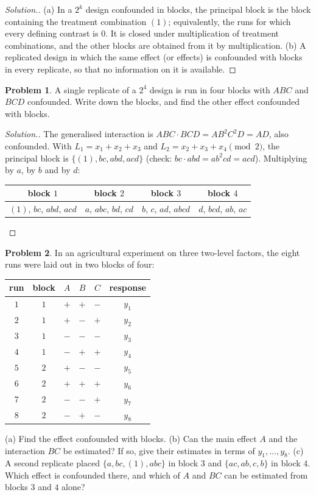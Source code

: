 \documentclass[11pt,a4paper]{article}
\numberwithin{equation}{section}
\theoremstyle{definition}
\newtheorem{problemx}{Problem}[subsection]
\newenvironment{problem}{\begin{problemx}}{\end{problemx}}
\newenvironment{solution}
  {\renewcommand{\qedsymbol}{}\begin{proof}[\textit{Solution}.]}
  {\end{proof}}
\begin{document}
\begin{solution}
(a) In a $2^k$ design confounded in blocks, the principal block is the block containing the treatment combination $(1)$; equivalently, the runs for
which every defining contrast is $0$. It is closed under multiplication of treatment combinations, and the other blocks are obtained from it by
multiplication. (b) A replicated design in which the same effect (or effects) is confounded with blocks in every replicate, so that no information
on it is available.
\end{solution}

\begin{problem}
A single replicate of a $2^4$ design is run in four blocks with $ABC$ and $BCD$ confounded. Write down the blocks, and find the other effect confounded
with blocks.
\end{problem}

\begin{solution}
The generalised interaction is $ABC \cdot BCD = AB^2C^2D = AD$, also confounded. With $L_1 = x_1 + x_2 + x_3$ and $L_2 = x_2 + x_3 + x_4 \pmod 2$, the principal block is
$\{(1), bc, abd, acd\}$ (check: $bc \cdot abd = ab^2cd = acd$). Multiplying by $a$, by $b$ and by $d$:
\begin{center}
\begin{tabular}{c|c|c|c}
block $1$ & block $2$ & block $3$ & block $4$ \\
\hline
$(1)$, $bc$, $abd$, $acd$ & $a$, $abc$, $bd$, $cd$ & $b$, $c$, $ad$, $abcd$ & $d$, $bcd$, $ab$, $ac$
\end{tabular}
\end{center}
\end{solution}

\begin{problem}
In an agricultural experiment on three two-level factors, the eight runs were laid out in two blocks of four:
\begin{center}
\begin{tabular}{c|c|ccc|c}
run & block & $A$ & $B$ & $C$ & response \\
\hline
$1$ & $1$ & $+$ & $+$ & $-$ & $y_1$ \\
$2$ & $1$ & $+$ & $-$ & $+$ & $y_2$ \\
$3$ & $1$ & $-$ & $-$ & $-$ & $y_3$ \\
$4$ & $1$ & $-$ & $+$ & $+$ & $y_4$ \\
$5$ & $2$ & $+$ & $-$ & $-$ & $y_5$ \\
$6$ & $2$ & $+$ & $+$ & $+$ & $y_6$ \\
$7$ & $2$ & $-$ & $-$ & $+$ & $y_7$ \\
$8$ & $2$ & $-$ & $+$ & $-$ & $y_8$
\end{tabular}
\end{center}
(a) Find the effect confounded with blocks. (b) Can the main effect $A$ and the interaction $BC$ be estimated? If so, give their estimates in terms of
$y_1, \dots, y_8$. (c) A second replicate placed $\{a, bc, (1), abc\}$ in block $3$ and $\{ac, ab, c, b\}$ in block $4$. Which effect is confounded there, and which of $A$ and
$BC$ can be estimated from blocks $3$ and $4$ alone?
\end{problem}
\end{document}
